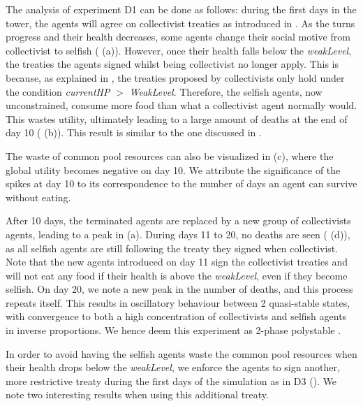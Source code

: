 The analysis of experiment D1 can be done as follows: during the first days in the tower, the agents will agree on collectivist treaties as introduced in . As the turns progress and their health decreases, some agents change their social motive from collectivist to selfish ( (a)). However, once their health falls below the \textit{weakLevel}, the treaties the agents signed whilst being collectivist no longer apply. This is because, as explained in , the treaties proposed by collectivists only hold under the condition \textit{currentHP} $>$ \textit{WeakLevel}. Therefore, the selfish agents, now unconstrained, consume more food than what a collectivist agent normally would. This wastes utility, ultimately leading to a large amount of deaths at the end of day 10 ( (b)). This result is similar to the one discussed in .

The waste of common pool resources can also be visualized in  (c), where the global utility becomes negative on day 10. We attribute the significance of the spikes at day 10 to its correspondence to the number of days an agent can survive without eating.

After 10 days, the terminated agents are replaced by a new group of collectivists agents, leading to a peak in  (a). During days 11 to 20, no deaths are seen ( (d)), as all selfish agents are still following the treaty they signed when collectivist. Note that the new agents introduced on day 11 sign the collectivist treaties and will not eat any food if their health is above the \textit{weakLevel}, even if they become selfish. On day 20, we note a new peak in the number of deaths, and this process repeats itself. This results in oscillatory behaviour between 2 quasi-stable states, with convergence to both a high concentration of collectivists and selfish agents in inverse proportions. We hence deem this experiment as 2-phase polystable \cite{ashby2015design}.



In order to avoid having the selfish agents waste the common pool resources when their health drops below the \textit{weakLevel}, we enforce the agents to sign another, more restrictive treaty during the first days of the simulation as in D3 (). We note two interesting results when using this additional treaty.

